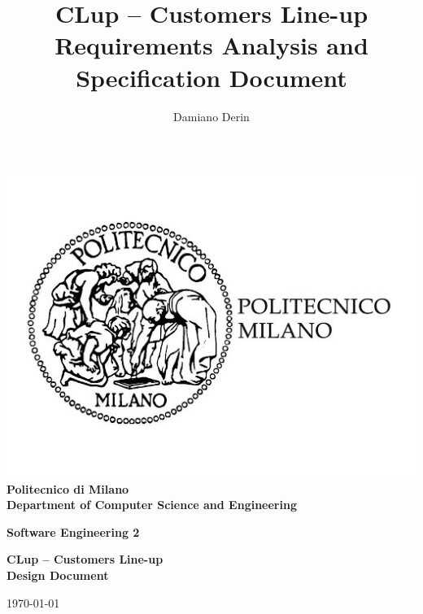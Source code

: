 \title{CLup – Customers Line-up \\ Requirements Analysis and Specification Document}
\author{Damiano Derin}

    \begin{titlepage}
        \begin{center}
            \BgThispage
            \includegraphics[scale=0.3]{images/polimi_logo.jpg}\\
            {\LARGE {\bfseries Politecnico di Milano \\}}
            \vspace{.5cm}
            {\Large {\bfseries Department of Computer Science and Engineering \\}}
            \vspace{1.0cm}

            {\Large {\bfseries Software Engineering 2 \\}}
            \vspace{2.0cm}


            {\LARGE {\bfseries CLup – Customers Line-up \\
            Design Document\\}}
            \vspace{1cm}

            {\large \today \\
            }



\end{center}
\end{titlepage}
